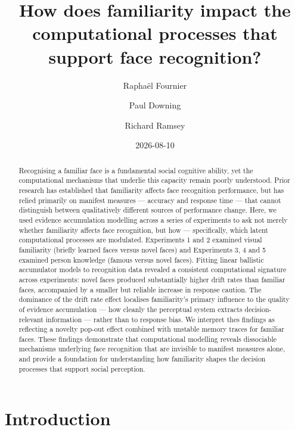 \documentclass[
  letterpaper,
  DIV=11,
  numbers=noendperiod]{scrartcl}
\title{How does familiarity impact the computational processes that
support face recognition?}
\author{Raphaël Fournier \and Paul Downing \and Richard Ramsey}
\date{2026-08-10}
\begin{document}
\maketitle
\begin{abstract}
Recognising a familiar face is a fundamental social cognitive ability,
yet the computational mechanisms that underlie this capacity remain
poorly understood. Prior research has established that familiarity
affects face recognition performance, but has relied primarily on
manifest measures --- accuracy and response time --- that cannot
distinguish between qualitatively different sources of performance
change. Here, we used evidence accumulation modelling across a series of
experiments to ask not merely whether familiarity affects face
recognition, but how --- specifically, which latent computational
processes are modulated. Experiments 1 and 2 examined visual familiarity
(briefly learned faces versus novel faces) and Experiments 3, 4 and 5
examined person knowledge (famous versus novel faces). Fitting linear
ballistic accumulator models to recognition data revealed a consistent
computational signature across experiments: novel faces produced
substantially higher drift rates than familiar faces, accompanied by a
smaller but reliable increase in response caution. The dominance of the
drift rate effect localises familiarity's primary influence to the
quality of evidence accumulation --- how cleanly the perceptual system
extracts decision-relevant information --- rather than to response bias.
We interpret thes findings as reflecting a novelty pop-out effect
combined with unstable memory traces for familiar faces. These findings
demonstrate that computational modelling reveals dissociable mechanisms
underlying face recognition that are invisible to manifest measures
alone, and provide a foundation for understanding how familiarity shapes
the decision processes that support social perception.
\end{abstract}


\newpage{}

\section{Introduction}\label{introduction}
\end{document}

